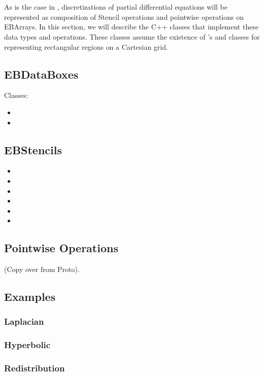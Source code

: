 \documentclass[12pt]{article}
\begin{document}
\section{} 

As is the case in , discretizations of partial differential equations will be represented as composition of Stencil operations and pointwise operations on EBArrays. In this section, we will describe the C++ classes that implement these data types and operations. These classes assume the existence of 's  and  classes for representing rectangular regions on a Cartesian grid.

\subsection{}

\subsection{EBDataBoxes}
Classes:
\begin{itemize}
\item
{}
\item
{}
\end{itemize}

\subsection{EBStencils}
\begin{itemize}
\item
{}
\item
{}
\item
{}
\item
{}
\item
{}
\item
{}
\end{itemize}

\subsection{Pointwise Operations}
(Copy over from Proto).

\subsection{Examples}
\subsubsection{Laplacian}
\subsubsection{Hyperbolic}
\subsubsection{Redistribution}
\end{document}
